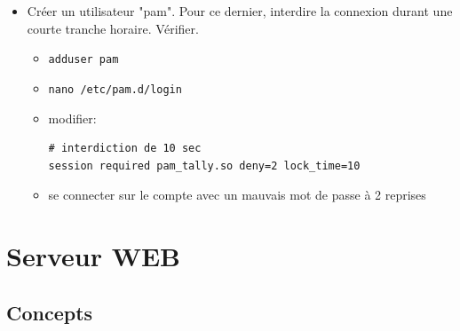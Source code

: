 \documentclass[a4paper]{article}
\begin{document}
\begin{itemize}
\item Créer un utilisateur "pam". Pour ce dernier, interdire la connexion durant une courte tranche horaire. Vérifier.
\begin{example}
    \begin{itemize}
        \item \texttt{adduser pam}
        \item \texttt{nano /etc/pam.d/login}
        \item modifier:
        \begin{verbatim}
# interdiction de 10 sec
session required pam_tally.so deny=2 lock_time=10
        \end{verbatim}
        \item se connecter sur le compte avec un mauvais mot de passe à 2 reprises
    \end{itemize}
\end{example}

\end{itemize}















\section{Serveur WEB}










\subsection{Concepts}
\end{document}
